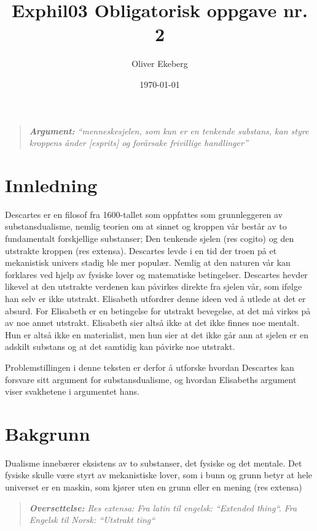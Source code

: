 \documentclass[12pt, a4paper]{article}
\title{Exphil03 Obligatorisk oppgave nr. 2}
\author{Oliver Ekeberg}
\date{\today}
\newenvironment{argument}{\begin{quote}\itshape\textbf{Argument: }}{\end{quote}}
\newenvironment{oversettelse}{\begin{quote}\itshape\textbf{Oversettelse: }}{\end{quote}}
\begin{document}
\maketitle

\tableofcontents

\begin{argument}
    ``menneskesjelen, som kun er en tenkende substans, kan styre kroppens ånder [esprits] og forårsake frivillige handlinger''
\end{argument}

\section{Innledning}

Descartes er en filosof fra 1600-tallet som oppfattes som grunnleggeren av substansdualisme, nemlig teorien om at sinnet og kroppen vår består av to fundamentalt forskjellige substanser; Den tenkende sjelen (res cogito) og den utstrakte kroppen (res extensa). Descartes levde i en tid der troen på et mekanistisk univers stadig ble mer populær. Nemlig at den naturen vår kan forklares ved hjelp av fysiske lover og matematiske betingelser. Descartes hevder likevel at den utstrakte verdenen kan påvirkes direkte fra sjelen vår, som ifølge han selv er ikke utstrakt. Elisabeth utfordrer denne ideen ved å utlede at det er absurd. For Elisabeth er en betingelse for utstrakt bevegelse, at det må virkes på av noe annet utstrakt. Elisabeth sier altså ikke at det ikke finnes noe mentalt. Hun er altså ikke en materialist, men hun sier at det ikke går ann at sjelen er en adskilt substans og at det samtidig kan påvirke noe utstrakt.

Problemstillingen i denne teksten er derfor å utforske hvordan Descartes kan forsvare sitt argument for substansdualisme, og hvordan Elisabeths argument viser svakhetene i argumentet hans.
\section{Bakgrunn}

Dualisme innebærer eksistens av to substanser, det fysiske og det mentale. Det fysiske skulle være styrt av mekanistiske lover, som i bunn og grunn betyr at hele universet er en maskin, som kjører uten en grunn eller en mening (res extensa)

\begin{oversettelse}
    Res extensa: Fra latin til engelsk: ``Extended thing``. Fra Engelsk til Norsk: ``Utstrakt ting``
\end{oversettelse}
\end{document}
